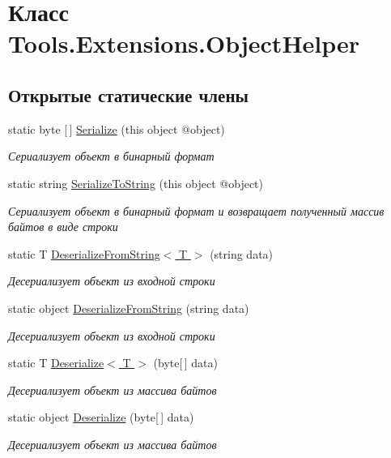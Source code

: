 \hypertarget{class_tools_1_1_extensions_1_1_object_helper}{}\section{Класс Tools.\+Extensions.\+Object\+Helper}
\label{class_tools_1_1_extensions_1_1_object_helper}
\subsection*{Открытые статические члены}
\begin{DoxyCompactItemize}
\item 
static byte \mbox{[}$\,$\mbox{]} \hyperlink{class_tools_1_1_extensions_1_1_object_helper_abd2c46ca419822530e491486a73cd0e4}{Serialize} (this object @object)
\begin{DoxyCompactList}\small\item\em Сериализует объект в бинарный формат \end{DoxyCompactList}\item 
static string \hyperlink{class_tools_1_1_extensions_1_1_object_helper_ac2cdaa919baa35f0cc0e69761e04c86b}{Serialize\+To\+String} (this object @object)
\begin{DoxyCompactList}\small\item\em Сериализует объект в бинарный формат и возвращает полученный массив байтов в виде строки \end{DoxyCompactList}\item 
static T \hyperlink{class_tools_1_1_extensions_1_1_object_helper_a504eb45071b2c1ed166f7901d8f24b4f}{Deserialize\+From\+String$<$ T $>$} (string data)
\begin{DoxyCompactList}\small\item\em Десериализует объект из входной строки \end{DoxyCompactList}\item 
static object \hyperlink{class_tools_1_1_extensions_1_1_object_helper_a2dd94da1024292cb58b13470fa6098ea}{Deserialize\+From\+String} (string data)
\begin{DoxyCompactList}\small\item\em Десериализует объект из входной строки \end{DoxyCompactList}\item 
static T \hyperlink{class_tools_1_1_extensions_1_1_object_helper_a02cf5ec56eebde420b8baa225a04e83d}{Deserialize$<$ T $>$} (byte\mbox{[}$\,$\mbox{]} data)
\begin{DoxyCompactList}\small\item\em Десериализует объект из массива байтов \end{DoxyCompactList}\item 
static object \hyperlink{class_tools_1_1_extensions_1_1_object_helper_a1f1a9f90cbeb2e866dd5cf84c454240d}{Deserialize} (byte\mbox{[}$\,$\mbox{]} data)
\begin{DoxyCompactList}\small\item\em Десериализует объект из массива байтов \end{DoxyCompactList}\end{DoxyCompactItemize}


